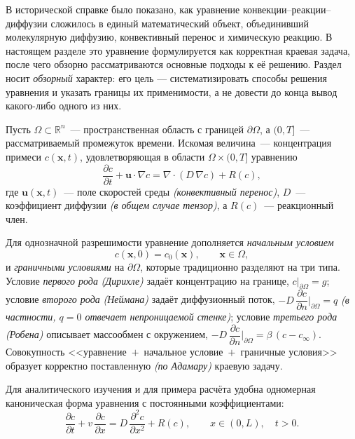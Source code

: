 
    В исторической справке было показано, как уравнение конвекции--реакции--диффузии
    сложилось в единый математический объект, объединивший молекулярную диффузию,
    конвективный перенос и химическую реакцию. В настоящем разделе это уравнение
    формулируется как корректная краевая задача, после чего обзорно рассматриваются
    основные подходы к её решению. Раздел носит \textit{обзорный} характер: его цель ---
    систематизировать способы решения уравнения и указать границы их применимости,
    а не довести до конца вывод какого-либо одного из них.


        Пусть $\Omega \subset \mathbb{R}^n$~--- пространственная область с границей $\partial\Omega$,
        а $(0, T]$~--- рассматриваемый промежуток времени.
        Искомая величина~--- концентрация примеси $c(\mathbf{x}, t)$,
        удовлетворяющая в области $\Omega \times (0, T]$ уравнению
        \[
            \frac{\partial c}{\partial t}
            + \mathbf{u} \cdot \nabla c
            = \nabla \cdot (D\,\nabla c)
            + R(c),
        \]
        где $\mathbf{u}(\mathbf{x}, t)$~--- поле скоростей среды \textit{(конвективный перенос)},
        $D$~--- коэффициент диффузии \textit{(в общем случае тензор)},
        а $R(c)$~--- реакционный член.

        Для однозначной разрешимости уравнение дополняется \textit{начальным условием}
        \[
            c(\mathbf{x}, 0) = c_0(\mathbf{x}), \qquad \mathbf{x} \in \Omega,
        \]
        и \textit{граничными условиями} на $\partial\Omega$, которые традиционно
        разделяют на три типа. Условие \textit{первого рода} \textit{(Дирихле)} задаёт
        концентрацию на границе, $c\big|_{\partial\Omega} = g$; условие \textit{второго рода}
        \textit{(Неймана)} задаёт диффузионный поток,
        $-D\,\dfrac{\partial c}{\partial n}\big|_{\partial\Omega} = q$
        \textit{(в частности, $q = 0$ отвечает непроницаемой стенке)};
        условие \textit{третьего рода} \textit{(Робена)} описывает массообмен
        с окружением, $-D\,\dfrac{\partial c}{\partial n}\big|_{\partial\Omega}
        = \beta\,(c - c_\infty)$.
        Совокупность <<уравнение~$+$~начальное условие~$+$~граничные условия>>
        образует корректно поставленную \textit{(по Адамару)} краевую задачу.

        Для аналитического изучения и для примера расчёта удобна одномерная
        каноническая форма уравнения с постоянными коэффициентами:
        \[
            \frac{\partial c}{\partial t}
            + v\,\frac{\partial c}{\partial x}
            = D\,\frac{\partial^2 c}{\partial x^2}
            + R(c),
            \qquad x \in (0, L), \quad t > 0.
        \]

